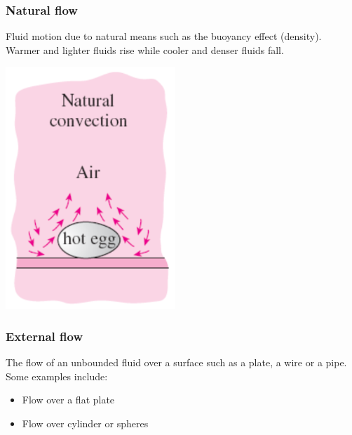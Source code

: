\documentclass[11pt]{article}
\begin{document}
\subsubsection{Natural flow}
\label{sec:org0c5096f}
Fluid motion due to natural means such as the buoyancy effect (density). Warmer and lighter fluids rise while cooler and denser fluids fall.
\begin{center}
\includegraphics[width=.9\linewidth]{./images/natural-flow-diagram.png}
\end{center}

\subsubsection{External flow}
\label{sec:org5781aa0}
The flow of an unbounded fluid over a surface such as a plate, a wire or a pipe. Some examples include:
\begin{itemize}
\item Flow over a flat plate
\item Flow over cylinder or spheres
\end{itemize}
\end{document}
